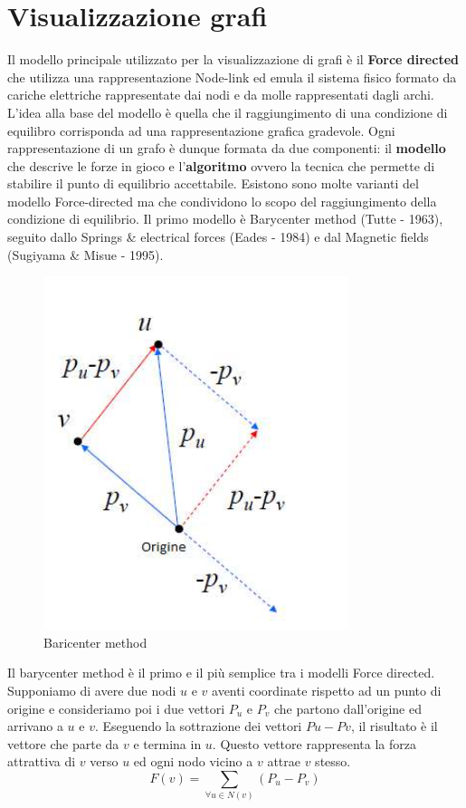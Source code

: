 {\section{Visualizzazione grafi}
Il modello principale utilizzato per la visualizzazione di grafi è il \textbf{Force directed} che utilizza una rappresentazione Node-link ed emula il sistema fisico formato da cariche elettriche rappresentate dai nodi e da molle rappresentati dagli archi. L'idea alla base del modello è quella che il raggiungimento di una condizione di equilibro corrisponda ad una rappresentazione grafica gradevole. Ogni rappresentazione di un grafo è dunque formata da due componenti: il \textbf{modello} che descrive le forze in gioco e l'\textbf{algoritmo} ovvero la tecnica che permette di stabilire il punto di equilibrio accettabile. Esistono sono molte varianti del modello Force-directed ma che condividono lo scopo del raggiungimento della condizione di equilibrio. Il primo modello è Barycenter method (Tutte - 1963), seguito dallo Springs \&
electrical forces (Eades - 1984) e dal Magnetic fields (Sugiyama \& Misue - 1995).
\newpage
\begin{figure}[!htb]
	\begin{center}
		\includegraphics[width=0.4 \linewidth]{figure/baricenter}
	\end{center}
	\caption{Baricenter method\label{fig:baricenter}}
\end{figure}
Il barycenter method è il primo e il più semplice tra i modelli Force directed. Supponiamo di avere due nodi $u$ e $v$ aventi coordinate rispetto ad un punto di origine e consideriamo poi i due vettori $P_u$ e $P_v$ che partono dall'origine ed arrivano a $u$ e $v$. Eseguendo la sottrazione dei vettori $Pu - Pv$, il risultato è il vettore che parte da $v$ e termina in $u$. Questo vettore rappresenta la forza attrattiva di $v$ verso $u$ ed ogni nodo vicino a $v$ attrae $v$ stesso.
$$ F(v)= \sum\limits_{\forall u \in N(v)} (P_u-P_v) $$
}
